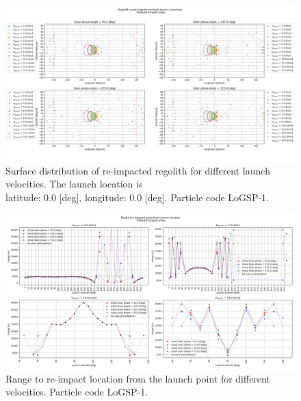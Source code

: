 \begin{figure}[htb]
\centering
\captionsetup{justification=centering}
\includegraphics[angle=90, width=\textwidth, height=\textheight]{longest_edge_perturbations/3.2Density_1cmSize/crash_map_all_solar_phases.png}
\caption{Surface distribution of re-impacted regolith for different launch velocities. The launch location is \\ latitude: 0.0 [deg], longitude: 0.0 [deg]. Particle code LoGSP-1.}
\label{fig:LoGSP_1_crashmap}
\end{figure}
\FloatBarrier
\begin{figure}[htb]
\centering
\captionsetup{justification=centering}
\includegraphics[angle=90, width=\textwidth, height=\textheight]{longest_edge_perturbations/3.2Density_1cmSize/reimpactRangeComparison.png}
\caption{Range to re-impact location from the launch point for different velocities. Particle code LoGSP-1.}
\label{fig:LoGSP_1_range_comparison}
\end{figure}
\FloatBarrier
